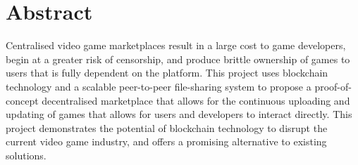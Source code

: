 \section*{Abstract}

Centralised video game marketplaces result in a large cost to game developers, begin at a greater risk of censorship, and produce brittle ownership of games to users that is fully dependent on the platform. 
This project uses blockchain technology and a scalable peer-to-peer file-sharing system to propose a proof-of-concept decentralised marketplace that allows for the continuous uploading and updating of games that allows for users and developers to interact directly.
This project demonstrates the potential of blockchain technology to disrupt the current video game industry, and offers a promising alternative to existing solutions.
